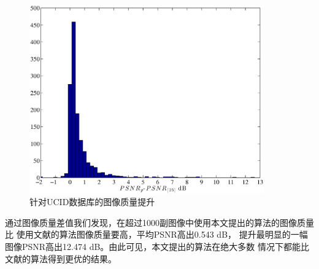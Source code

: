 \begin{figure}[!h]
  \centering 
  \includegraphics[width=0.9\textwidth]{figures/ucid_results.eps}
  \caption{针对UCID数据库的图像质量提升}
  \label{fig:ucid_results}
\end{figure}
\par
通过图像质量差值我们发现，在超过1000副图像中使用本文提出的算法的图像质量比
使用文献\cite{li2013reversible}的算法图像质量要高，平均PSNR高出0.543 dB，
提升最明显的一幅图像PSNR高出12.474 dB。由此可见，本文提出的算法在绝大多数
情况下都能比文献\cite{li2013reversible}的算法得到更优的结果。
